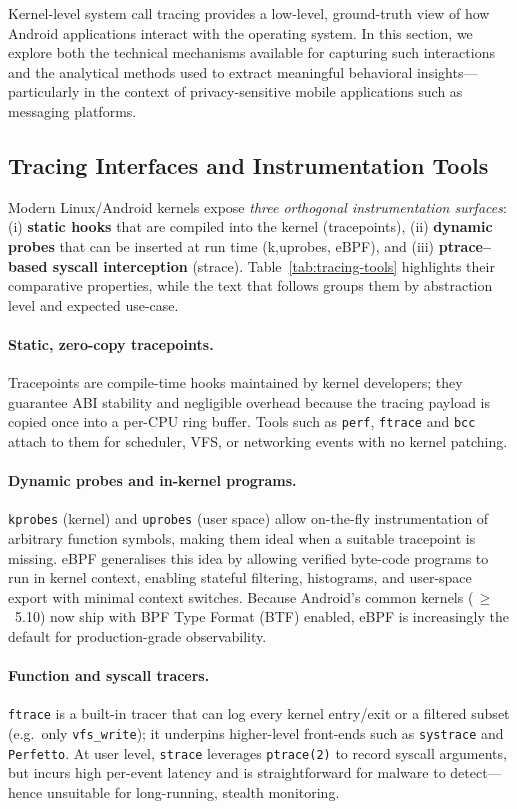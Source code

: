 \documentclass[a4paper,12pt]{report}
\begin{document}
Kernel-level system call tracing provides a low-level, ground-truth view of how Android applications interact with the operating system. In this section, we explore both the technical mechanisms available for capturing such interactions and the analytical methods used to extract meaningful behavioral insights—particularly in the context of privacy-sensitive mobile applications such as messaging platforms.

\subsection{Tracing Interfaces and Instrumentation Tools}

Modern Linux/Android kernels expose \emph{three orthogonal instrumentation surfaces}: (i) \textbf{static hooks} that are compiled into the kernel (tracepoints), (ii) \textbf{dynamic probes} that can be inserted at run time (k{,u}probes, eBPF), and (iii) \textbf{ptrace--based syscall interception} (strace).  Table~\ref{tab:tracing-tools} highlights their comparative properties, while the text that follows groups them by abstraction level and expected use-case.

\paragraph{Static, zero-copy tracepoints.}
Tracepoints are compile-time hooks maintained by kernel developers; they guarantee ABI stability and negligible overhead because the tracing payload is copied once into a per-CPU ring buffer.  Tools such as \texttt{perf}, \texttt{ftrace} and \texttt{bcc} attach to them for scheduler, VFS, or networking events with no kernel patching.

\paragraph{Dynamic probes and in-kernel programs.}
\texttt{kprobes} (kernel) and \texttt{uprobes} (user space) allow on-the-fly instrumentation of arbitrary function symbols, making them ideal when a suitable tracepoint is missing.  eBPF generalises this idea by allowing verified byte-code programs to run in kernel context, enabling stateful filtering, histograms, and user-space export with minimal context switches.  Because Android’s common kernels (\,$\ge$~5.10) now ship with BPF Type Format (BTF) enabled, eBPF is increasingly the default for production-grade observability.

\paragraph{Function and syscall tracers.}
\texttt{ftrace} is a built-in tracer that can log every kernel entry/exit or a filtered subset (e.g.\ only \texttt{vfs\_write}); it underpins higher-level front-ends such as \texttt{systrace} and \texttt{Perfetto}.  At user level, \texttt{strace} leverages \texttt{ptrace(2)} to record syscall arguments, but incurs high per-event latency and is straightforward for malware to detect—hence unsuitable for long-running, stealth monitoring.
\end{document}
